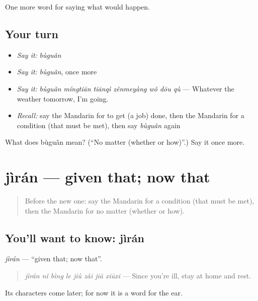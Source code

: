 \begin{grammarlens}[title={What you've built}]
One more word for saying what would happen.
\end{grammarlens}

\subsection*{Your turn}
\begin{itemize}
\raggedright
  \item \emph{Say it:} \emph{bùguǎn}
  \item \emph{Say it:} \emph{bùguǎn}, once more
  \item \emph{Say it:} \emph{bùguǎn míngtiān tiānqì zěnmeyàng wǒ dōu qù} — Whatever the weather tomorrow, I'm going.
  \item \emph{Recall:} say the Mandarin for to get (a job) done, then the Mandarin for a condition (that must be met), then say \emph{bùguǎn} again
\end{itemize}

\begin{tcolorbox}[breakable,colback=teal!4,colframe=teal!35!black,title={Before you move on}]
What does bùguǎn mean? (\textquotedblleft{}No matter (whether or how)\textquotedblright{}.) Say it once more.
\end{tcolorbox}
\section[jìrán]{jìrán — given that; now that}

\label{lesson:ZH-C396-jiran}



\begin{quote}
Before the new one: say the Mandarin for a condition (that must be met), then the Mandarin for no matter (whether or how).
\end{quote}

\subsection*{You'll want to know: jìrán}
\emph{jìrán} — \textquotedblleft{}given that; now that\textquotedblright{}.

\begin{quote}
\emph{jìrán nǐ bìng le jiù zài jiā xiūxi} — Since you're ill, stay at home and rest.
\end{quote}

Its characters come later; for now it is a word for the ear.

